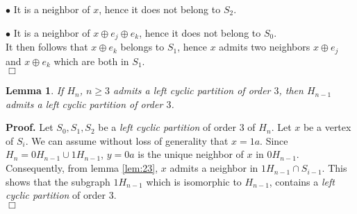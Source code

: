 \documentclass{article}
\newtheorem{lemma}{Lemma}
\begin{document}
$\bullet$ It is a neighbor of $x$, hence it does not belong to $S_2$.

$\bullet$ It is a neighbor of $x\oplus e_j\oplus e_k$, hence it does not belong to $S_0$.\\
It then follows that $x\oplus e_k$ belongs to $S_1$, hence $x$ admits two
neighbors $x\oplus e_j$ and $x\oplus e_k$ which are both in $S_1$.\\
$\Box$\\

\begin{lemma} \label{lem:3rec}
If $H_n$, $n\geq 3$ admits a {\em left cyclic partition} of order $3$, then 
$H_{n-1}$ admits a {\em left cyclic partition} of order $3$.
\end{lemma}
{\bf Proof.} Let $S_0,S_1,S_2$ be a {\em left cyclic partition} of order $3$ of 
$H_n$. Let $x$ be a vertex of $S_i$. We can assume without loss of generality
that $x=1a$. Since $H_n=0H_{n-1}\cup 1H_{n-1}$, 
$y=0a$ is the unique neighbor of $x$ in $0H_{n-1}$. Consequently, from lemma \ref{lem:23}, $x$ admits a neighbor in $1H_{n-1} \cap S_{i-1}$. This shows that the
subgraph $1H_{n-1}$ which is isomorphic to $H_{n-1}$, contains a {\em left
  cyclic partition} of order $3$.\\
$\Box$
\end{document}
